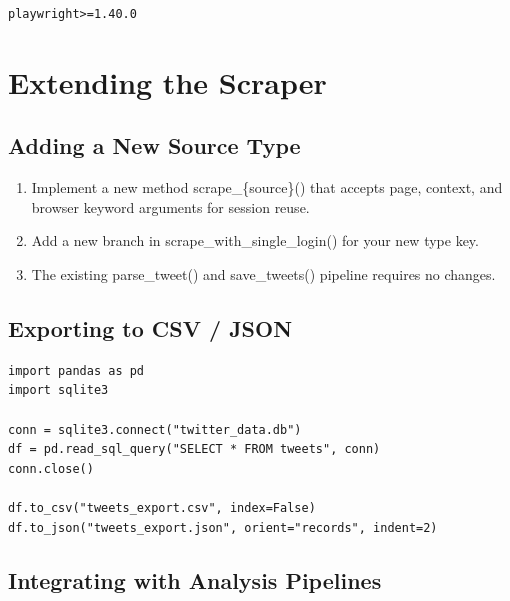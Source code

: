 \documentclass[11pt, a4paper]{article}
\def\method#1{#1}%
\def\param#1{#1}%
\def\texttt#1{#1}%
\def\color#1{}%
\newcommand{\method}[1]{\texttt{\color{TwBlue}#1}}
\newcommand{\param}[1]{\texttt{\color{TwGreen!70!black}#1}}
\begin{document}
\begin{tcolorbox}[pybox, title=requirements.txt]
\begin{lstlisting}[style=pycode]
playwright>=1.40.0
\end{lstlisting}
\end{tcolorbox}

\section{Extending the Scraper}

\subsection{Adding a New Source Type}

\begin{enumerate}[leftmargin=1.8em, itemsep=4pt]
  \item Implement a new method \method{scrape\_\{source\}()} that accepts \param{page},
        \param{context}, and \param{browser} keyword arguments for session reuse.
  \item Add a new branch in \method{scrape\_with\_single\_login()} for your new
        \texttt{type} key.
  \item The existing \method{parse\_tweet()} and \method{save\_tweets()} pipeline
        requires no changes.
\end{enumerate}

\subsection{Exporting to CSV / JSON}

\begin{tcolorbox}[pybox, title=Export to CSV with pandas]
\begin{lstlisting}[style=pycode]
import pandas as pd
import sqlite3

conn = sqlite3.connect("twitter_data.db")
df = pd.read_sql_query("SELECT * FROM tweets", conn)
conn.close()

df.to_csv("tweets_export.csv", index=False)
df.to_json("tweets_export.json", orient="records", indent=2)
\end{lstlisting}
\end{tcolorbox}

\subsection{Integrating with Analysis Pipelines}
\end{document}
